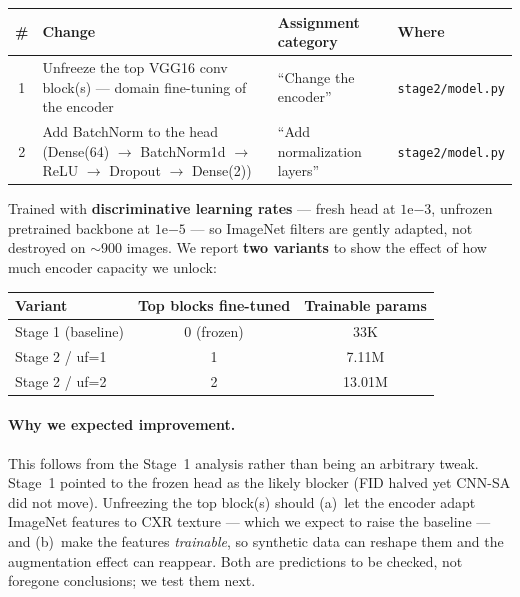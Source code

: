 \documentclass[11pt]{article}
\newcommand{\code}[1]{\texttt{#1}}
\begin{document}
\begin{table}[htbp]
\centering\small
\begin{tabular}{@{}clp{3.2cm}l@{}}
\toprule
\# & \textbf{Change} & \textbf{Assignment category} & \textbf{Where} \\
\midrule
1 & Unfreeze the top VGG16 conv block(s) --- domain fine-tuning of the encoder & ``Change the encoder'' & \code{stage2/model.py} \\
2 & Add BatchNorm to the head (Dense(64) $\rightarrow$ BatchNorm1d $\rightarrow$ ReLU $\rightarrow$ Dropout $\rightarrow$ Dense(2)) & ``Add normalization layers'' & \code{stage2/model.py} \\
\bottomrule
\end{tabular}
\end{table}

Trained with \textbf{discriminative learning rates} --- fresh head at
$1\mathrm{e}{-3}$, unfrozen pretrained backbone at $1\mathrm{e}{-5}$ --- so
ImageNet filters are gently adapted, not destroyed on $\sim$900 images. We report
\textbf{two variants} to show the effect of how much encoder capacity we unlock:

\begin{table}[htbp]
\centering
\begin{tabular}{@{}lcc@{}}
\toprule
\textbf{Variant} & \textbf{Top blocks fine-tuned} & \textbf{Trainable params} \\
\midrule
Stage 1 (baseline) & 0 (frozen) & 33K \\
Stage 2 / uf=1 & 1 & 7.11M \\
Stage 2 / uf=2 & 2 & 13.01M \\
\bottomrule
\end{tabular}
\end{table}

\paragraph{Why we expected improvement.} This follows from the Stage~1 analysis
rather than being an arbitrary tweak. Stage~1 pointed to the frozen head as the
likely blocker (FID halved yet CNN-SA did not move). Unfreezing the top block(s)
should (a)~let the encoder adapt ImageNet features to CXR texture --- which we
expect to raise the baseline --- and (b)~make the features \emph{trainable}, so
synthetic data can reshape them and the augmentation effect can reappear. Both are
predictions to be checked, not foregone conclusions; we test them next.
\end{document}
